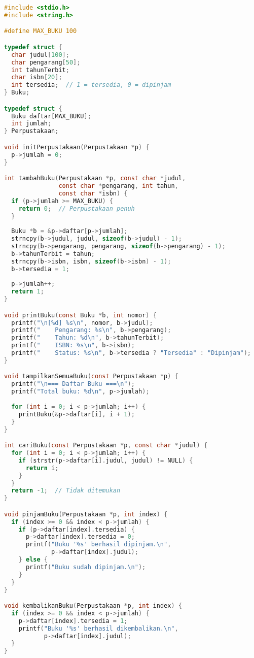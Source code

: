 \documentclass[../main.tex]{subfiles}
\begin{document}
\begin{lstlisting}[language=C, caption={Sistem perpustakaan sederhana di C}]
#include <stdio.h>
#include <string.h>

#define MAX_BUKU 100

typedef struct {
  char judul[100];
  char pengarang[50];
  int tahunTerbit;
  char isbn[20];
  int tersedia;  // 1 = tersedia, 0 = dipinjam
} Buku;

typedef struct {
  Buku daftar[MAX_BUKU];
  int jumlah;
} Perpustakaan;

void initPerpustakaan(Perpustakaan *p) {
  p->jumlah = 0;
}

int tambahBuku(Perpustakaan *p, const char *judul, 
               const char *pengarang, int tahun, 
               const char *isbn) {
  if (p->jumlah >= MAX_BUKU) {
    return 0;  // Perpustakaan penuh
  }
  
  Buku *b = &p->daftar[p->jumlah];
  strncpy(b->judul, judul, sizeof(b->judul) - 1);
  strncpy(b->pengarang, pengarang, sizeof(b->pengarang) - 1);
  b->tahunTerbit = tahun;
  strncpy(b->isbn, isbn, sizeof(b->isbn) - 1);
  b->tersedia = 1;
  
  p->jumlah++;
  return 1;
}

void printBuku(const Buku *b, int nomor) {
  printf("\n[%d] %s\n", nomor, b->judul);
  printf("    Pengarang: %s\n", b->pengarang);
  printf("    Tahun: %d\n", b->tahunTerbit);
  printf("    ISBN: %s\n", b->isbn);
  printf("    Status: %s\n", b->tersedia ? "Tersedia" : "Dipinjam");
}

void tampilkanSemuaBuku(const Perpustakaan *p) {
  printf("\n=== Daftar Buku ===\n");
  printf("Total buku: %d\n", p->jumlah);
  
  for (int i = 0; i < p->jumlah; i++) {
    printBuku(&p->daftar[i], i + 1);
  }
}

int cariBuku(const Perpustakaan *p, const char *judul) {
  for (int i = 0; i < p->jumlah; i++) {
    if (strstr(p->daftar[i].judul, judul) != NULL) {
      return i;
    }
  }
  return -1;  // Tidak ditemukan
}

void pinjamBuku(Perpustakaan *p, int index) {
  if (index >= 0 && index < p->jumlah) {
    if (p->daftar[index].tersedia) {
      p->daftar[index].tersedia = 0;
      printf("Buku '%s' berhasil dipinjam.\n", 
             p->daftar[index].judul);
    } else {
      printf("Buku sudah dipinjam.\n");
    }
  }
}

void kembalikanBuku(Perpustakaan *p, int index) {
  if (index >= 0 && index < p->jumlah) {
    p->daftar[index].tersedia = 1;
    printf("Buku '%s' berhasil dikembalikan.\n", 
           p->daftar[index].judul);
  }
}


\end{lstlisting}
\end{document}
